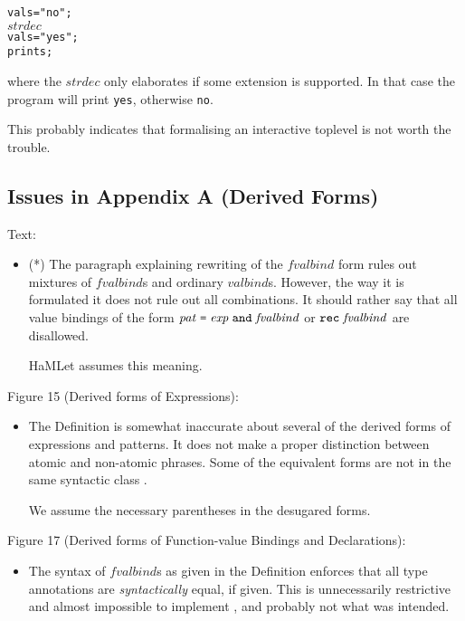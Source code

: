 \documentclass[twoside,titlepage]{article}
\begin{document}
\begin{appendix}
\begin{itemize}
\begin{quoting}
\begin{alltt}
val s = "no";
\(\mathit{strdec}\)
val s = "yes";
print s;
\end{alltt}
\end{quoting}

where the $\mathit{strdec}$ only elaborates if some extension is supported. In that case the program will print {\tt yes}, otherwise {\tt no}.

This probably indicates that formalising an interactive toplevel is not worth the trouble.
\end{itemize}


\subsection{Issues in Appendix A (Derived Forms)}
\label{bugsappendixa}

Text:

\begin{itemize}
\item (*) The paragraph explaining rewriting of the $\mathit{fvalbind}$ form rules out mixtures of $\mathit{fvalbind}$s and ordinary $\mathit{valbind}$s. However, the way it is formulated it does not rule out all combinations. It should rather say that all value bindings of the form $\mathit{pat}\;\mbox{\tt=}\;\mathit{exp}\;{\tt and}\;\mathit{fvalbind}$ or ${\tt rec}\;\mathit{fvalbind}$ are disallowed.

HaMLet assumes this meaning.
\end{itemize}

Figure 15 (Derived forms of Expressions):

\begin{itemize}
\item The Definition is somewhat inaccurate about several of the derived forms of expressions and patterns. It does not make a proper distinction between atomic and non-atomic phrases. Some of the equivalent forms are not in the same syntactic class \cite{commentary, mistakes}.

We assume the necessary parentheses in the desugared forms.
\end{itemize}


Figure 17 (Derived forms of Function-value Bindings and Declarations):

\begin{itemize}
\item The syntax of $\mathit{fvalbind}$s as given in the Definition enforces that all type annotations are \emph{syntactically} equal, if given. This is unnecessarily restrictive and almost impossible to implement \cite{mistakes}, and probably not what was intended.


\end{itemize}
\end{appendix}
\end{document}

